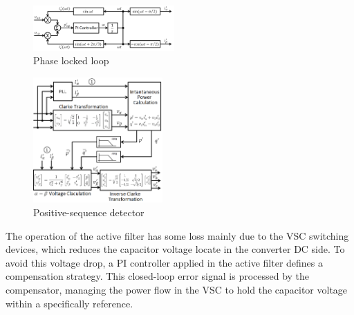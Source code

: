 \begin{figure}[!b]
	\centering
	\includegraphics[width=0.48\textwidth]{Figures/PLL.png}
	\caption{Phase locked loop}
	\label{fig:PLL.png}
\end{figure}

\begin{figure}[!b]
	\centering
	\includegraphics[width=0.44\textwidth]{Figures/detector_seq_positiva.png}
	\caption{Positive-sequence detector}
	\label{fig:detector_seq_positiva.png}
\end{figure}

The operation of the active filter has some loss mainly due to the VSC switching devices, which reduces the capacitor voltage locate in the converter DC side. To avoid this voltage drop, a PI controller applied in the active filter defines a compensation strategy. This closed-loop error signal is processed by the compensator, managing the power flow in the VSC to hold the capacitor voltage within a specifically reference.